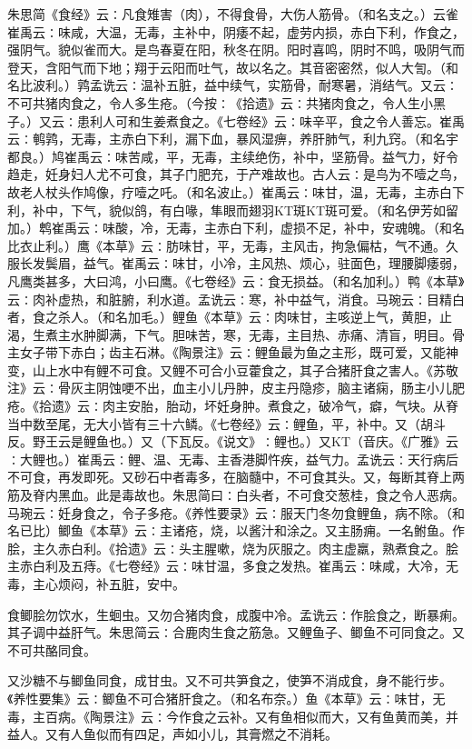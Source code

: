 \documentclass[a4paper,12pt,UTF8,twoside]{ctexbook}
\begin{document}
朱思简《食经》云∶凡食雉害（肉），不得食骨，大伤人筋骨。（和名支之。）云雀崔禹云∶味咸，大温，无毒，主补中，阴痿不起，虚劳内损，赤白下利，作食之，强阴气。貌似雀而大。是鸟春夏在阳，秋冬在阴。阳时喜鸣，阴时不鸣，吸阴气而登天，含阳气而下地；翔于云阳而吐气，故以名之。其音密密然，似人大訇。（和名比波利。）鹑孟诜云∶温补五脏，益中续气，实筋骨，耐寒暑，消结气。又云∶不可共猪肉食之，令人多生疮。（今按∶《拾遗》云∶共猪肉食之，令人生小黑子。）又云∶患利人可和生姜煮食之。《七卷经》云∶味辛平，食之令人善忘。崔禹云∶鹌鹑，无毒，主赤白下利，漏下血，暴风湿痹，养肝肺气，利九窍。（和名宇都良。）鸠崔禹云∶味苦咸，平，无毒，主续绝伤，补中，坚筋骨。益气力，好令趋走，妊身妇人尤不可食，其子门肥充，于产难故也。古人云∶是鸟为不噎之鸟，故老人杖头作鸠像，疗噎之吒。（和名波止。）崔禹云∶味甘，温，无毒，主赤白下利，补中，下气，貌似鸽，有白喙，隼眼而翅羽KT斑KT斑可爱。（和名伊芳如留加。）鹎崔禹云∶味酸，冷，无毒，主赤白下利，虚损不足，补中，安魂魄。（和名比衣止利。）鹰《本草》云∶肪味甘，平，无毒，主风击，拘急偏枯，气不通。久服长发鬓眉，益气。崔禹云∶味甘，小冷，主风热、烦心，驻面色，理腰脚痿弱，凡鹰类甚多，大曰鸿，小曰鹰。《七卷经》云∶食无损益。（和名加利。）鸭《本草》云∶肉补虚热，和脏腑，利水道。孟诜云∶寒，补中益气，消食。马琬云∶目精白者，食之杀人。（和名加毛。）鲤鱼《本草》云∶肉味甘，主咳逆上气，黄胆，止渴，生煮主水肿脚满，下气。胆味苦，寒，无毒，主目热、赤痛、清盲，明目。骨主女子带下赤白；齿主石淋。《陶景注》云∶鲤鱼最为鱼之主形，既可爱，又能神变，山上水中有鲤不可食。又鲤不可合小豆藿食之，其子合猪肝食之害人。《苏敬注》云∶骨灰主阴蚀哽不出，血主小儿丹肿，皮主丹隐疹，脑主诸痫，肠主小儿肥疮。《拾遗》云∶肉主安胎，胎动，坏妊身肿。煮食之，破冷气，癖，气块。从脊当中数至尾，无大小皆有三十六鳞。《七卷经》云∶鲤鱼，平，补中。又（胡斗反。野王云是鲤鱼也。）又（下瓦反。《说文》∶鲤也。）又KT（音庆。《广雅》云∶大鲤也。）崔禹云∶鲤、温、无毒、主香港脚忤疾，益气力。孟诜云∶天行病后不可食，再发即死。又砂石中者毒多，在脑髓中，不可食其头。又，每断其脊上两筋及脊内黑血。此是毒故也。朱思简曰∶白头者，不可食交葱桂，食之令人恶病。马琬云∶妊身食之，令子多疮。《养性要录》云∶服天门冬勿食鲤鱼，病不除。（和名已比）鲫鱼《本草》云∶主诸疮，烧，以酱汁和涂之。又主肠痈。一名鲋鱼。作脍，主久赤白利。《拾遗》云∶头主腥嗽，烧为灰服之。肉主虚羸，熟煮食之。脍主赤白利及五痔。《七卷经》云∶味甘温，多食之发热。崔禹云∶味咸，大冷，无毒，主心烦闷，补五脏，安中。

食鲫脍勿饮水，生蛔虫。又勿合猪肉食，成腹中冷。孟诜云∶作脍食之，断暴痢。其子调中益肝气。朱思简云∶合鹿肉生食之筋急。又鲤鱼子、鲫鱼不可同食之。又不可共酪同食。

又沙糖不与鲫鱼同食，成甘虫。又不可共笋食之，使笋不消成食，身不能行步。《养性要集》云∶鲫鱼不可合猪肝食之。（和名布奈。）鱼《本草》云∶味甘，无毒，主百病。《陶景注》云∶今作食之云补。又有鱼相似而大，又有鱼黄而美，并益人。又有人鱼似而有四足，声如小儿，其膏燃之不消耗。
\end{document}
